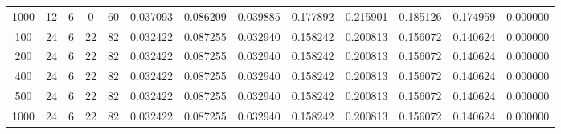 \begin{table}[h]
\begin{tabular}{ccccccccccccc}
1000 & 12 & 6 & 0 & 60 & 0.037093 & 0.086209 & 0.039885 & 0.177892 & 0.215901 & 0.185126 & 0.174959 & 0.000000 \\
100 & 24 & 6 & 22 & 82 & 0.032422 & 0.087255 & 0.032940 & 0.158242 & 0.200813 & 0.156072 & 0.140624 & 0.000000 \\
200 & 24 & 6 & 22 & 82 & 0.032422 & 0.087255 & 0.032940 & 0.158242 & 0.200813 & 0.156072 & 0.140624 & 0.000000 \\
400 & 24 & 6 & 22 & 82 & 0.032422 & 0.087255 & 0.032940 & 0.158242 & 0.200813 & 0.156072 & 0.140624 & 0.000000 \\
500 & 24 & 6 & 22 & 82 & 0.032422 & 0.087255 & 0.032940 & 0.158242 & 0.200813 & 0.156072 & 0.140624 & 0.000000 \\
1000 & 24 & 6 & 22 & 82 & 0.032422 & 0.087255 & 0.032940 & 0.158242 & 0.200813 & 0.156072 & 0.140624 & 0.000000 \\
\bottomrule
\end{tabular}
\end{table}
